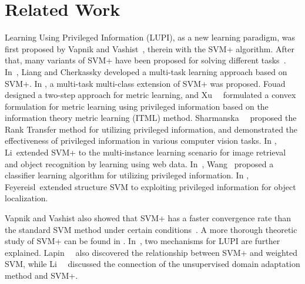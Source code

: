 \section{Related Work}
Learning Using Privileged Information (LUPI), as a new
learning paradigm, was first proposed by Vapnik and
Vashist~\cite{SVMplus_vapnik}, therein with the SVM+ algorithm. After
that, many variants of SVM+ have been proposed for solving different
tasks~\cite{MTLSVMPLUS,MetricPI,itmlplus,RankTransfer,Wang2015,Li2014ECCV}. In~\cite{MTLSVMPLUS},
Liang and Cherkassky developed a multi-task learning approach based on
SVM+. In \cite{MTMCSVMPLUS}, a multi-task multi-class extension of
SVM+ was proposed. Fouad~\etal~\cite{MetricPI} designed a two-step
approach for metric learning, and Xu~\etal~\cite{itmlplus} formulated
a convex formulation for metric learning using privileged information
based on the information theory metric learning (ITML)
method. Sharmanska~\etal~\cite{RankTransfer} proposed the Rank
Transfer method for utilizing privileged information, and demonstrated
the effectiveness of privileged information in various computer vision
tasks. In \cite{Li2014ECCV}, Li~\etal extended SVM+ to the
multi-instance learning scenario for image retrieval and object
recognition by learning using web data. In~\cite{Wang2015}, Wang~\etal
proposed a classifier learning algorithm for utilizing privileged
information. In \cite{Feyereisl2015}, Feyereisl~\etal extended
structure SVM to exploiting privileged information for object
localization.

Vapnik and Vashist also showed that SVM+ has a faster convergence rate
than the standard SVM method under certain
conditions~\cite{SVMplus_vapnik}. A more thorough theoretic study of
SVM+ can be found in \cite{LUPIThoery}. In~\cite{Vapnik2015}, two
mechanisms for LUPI are further
explained. Lapin~\etal~\cite{lapin2014learning} also discovered the
relationship between SVM+ and weighted SVM, while
Li~\etal~\cite{Li2014ECCV} discussed the connection of the
unsupervised domain adaptation method and SVM+.

